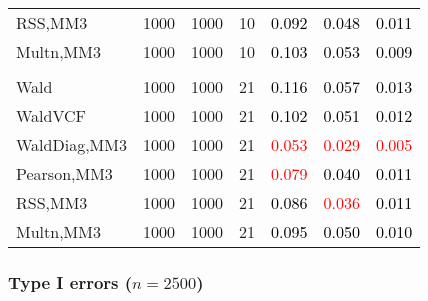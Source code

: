 \documentclass[
]{article}
\begin{document}
\begin{table}[H]
{\begin{tabular}[t]{lrrrrrr}
\hspace{1em}RSS,MM3 & 1000 & 1000 & 10 & \textcolor{black}{0.092} & \textcolor{black}{0.048} & \textcolor{black}{0.011}\\
\hspace{1em}Multn,MM3 & 1000 & 1000 & 10 & \textcolor{black}{0.103} & \textcolor{black}{0.053} & \textcolor{black}{0.009}\\
\addlinespace[0.3em]
\multicolumn{7}{l}{\textbf{3F 15V}}\\
\hspace{1em}Wald & 1000 & 1000 & 21 & \textcolor{black}{0.116} & \textcolor{black}{0.057} & \textcolor{black}{0.013}\\
\hspace{1em}WaldVCF & 1000 & 1000 & 21 & \textcolor{black}{0.102} & \textcolor{black}{0.051} & \textcolor{black}{0.012}\\
\hspace{1em}WaldDiag,MM3 & 1000 & 1000 & 21 & \textcolor{red}{0.053} & \textcolor{red}{0.029} & \textcolor{red}{0.005}\\
\hspace{1em}Pearson,MM3 & 1000 & 1000 & 21 & \textcolor{red}{0.079} & \textcolor{black}{0.040} & \textcolor{black}{0.011}\\
\hspace{1em}RSS,MM3 & 1000 & 1000 & 21 & \textcolor{black}{0.086} & \textcolor{red}{0.036} & \textcolor{black}{0.011}\\
\hspace{1em}Multn,MM3 & 1000 & 1000 & 21 & \textcolor{black}{0.095} & \textcolor{black}{0.050} & \textcolor{black}{0.010}\\
\bottomrule
\end{tabular}}
\endgroup{}
\end{table}

\subsubsection{\texorpdfstring{Type I errors
(\(n=2500\))}{Type I errors (n=2500)}}\label{type-i-errors-n2500-3}
\end{document}
